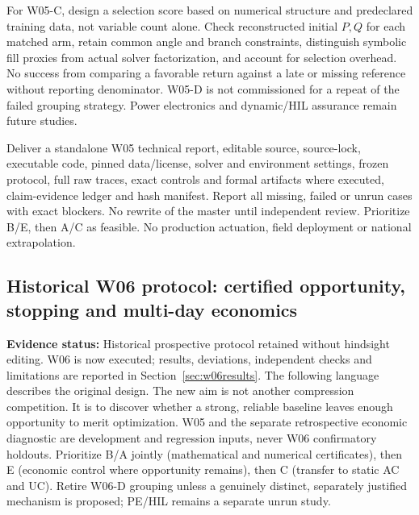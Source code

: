 \documentclass[11pt,letterpaper]{article}
\newcommand{\status}[1]{\textbf{Evidence status:} #1}
\begin{document}
For W05-C, design a selection score based on numerical structure and predeclared training data, not variable count alone. Check reconstructed initial $P,Q$ for each matched arm, retain common angle and branch constraints, distinguish symbolic fill proxies from actual solver factorization, and account for selection overhead. No success from comparing a favorable return against a late or missing reference without reporting denominator. W05-D is not commissioned for a repeat of the failed grouping strategy. Power electronics and dynamic/HIL assurance remain future studies.

Deliver a standalone W05 technical report, editable source, source-lock, executable code, pinned data/license, solver and environment settings, frozen protocol, full raw traces, exact controls and formal artifacts where executed, claim-evidence ledger and hash manifest. Report all missing, failed or unrun cases with exact blockers. No rewrite of the master until independent review. Prioritize B/E, then A/C as feasible. No production actuation, field deployment or national extrapolation.


\subsection{Historical W06 protocol: certified opportunity, stopping and multi-day economics}
\label{sec:w06}
\status{Historical prospective protocol retained without hindsight editing. W06 is now executed; results, deviations, independent checks and limitations are reported in Section~\ref{sec:w06results}. The following language describes the original design.}
The new aim is not another compression competition. It is to discover whether a strong, reliable baseline leaves enough opportunity to merit optimization. W05 and the separate retrospective economic diagnostic are development and regression inputs, never W06 confirmatory holdouts. Prioritize B/A jointly (mathematical and numerical certificates), then E (economic control where opportunity remains), then C (transfer to static AC and UC). Retire W06-D grouping unless a genuinely distinct, separately justified mechanism is proposed; PE/HIL remains a separate unrun study.
\end{document}
